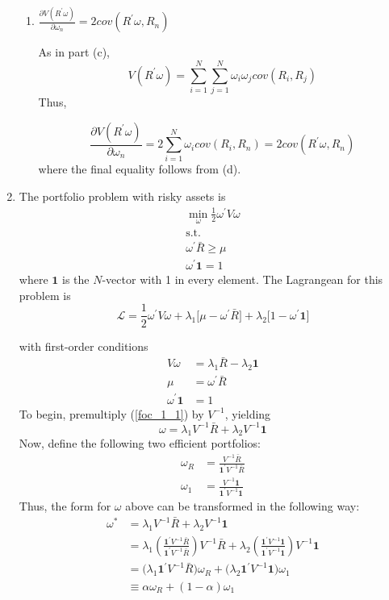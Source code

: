 \documentclass[11pt]{article}
\newcommand{\w}{\omega}
\newcommand{\p}{\prime}
\newcommand{\one}{\mathbf{1}}
\newcommand{\lagr}{\mathcal{L}}
\newcommand{\inv}[1]{#1^{-1}}
\renewcommand{\wp}{\omega^\prime}
\begin{document}
\begin{enumerate}
\begin{enumerate}
		\item $ \frac{\partial V(R^\p \w)}{\partial \w_n} = 2 cov(R^\p \w, R_n) $
		
		As in part (c), 
		\[V(R^\p \w) = \sum_{i = 1}^N \sum_{j = 1}^N \w_i \w_j cov(R_i, R_j)\]
		Thus,

		\[\frac{\partial V(R^\p \w)}{\partial \w_n} = 2 \sum_{i = 1}^N \w_i cov(R_i, R_n) = 2 cov(R^\p \w, R_n) \]
		where the final equality follows from (d).
	\end{enumerate}
	\item The portfolio problem with risky assets is 
	\begin{gather*}
	\min_\w \frac{1}{2}\w^\p V \w \\
	\text{s.t.} \\
	\w^\p \bar{R} \geq \mu \\
	\w^\p \one = 1
	\end{gather*}
	where $ \one $ is the $N$-vector with 1 in every element. The Lagrangean for this problem is
	\[\lagr = \frac{1}{2}\wp V \w + \lambda_1\big[\mu - \wp\bar{R}\big] + \lambda_2\big[1 - \wp \one\big]\]
	
	with first-order conditions
	\begin{align}
	V\w &= \lambda_1\bar{R} - \lambda_2\one \label{foc_1_1} \\
	\mu &= \wp \bar{R} \label{foc_1_2} \\
	\wp \one &= 1 \label{foc_1_3}
	\end{align}
	To begin, premultiply (\ref{foc_1_1}) by $ \inv{V} $, yielding
	\[\w = \lambda_1 \inv{V}\bar{R} + \lambda_2\inv{V}\one\]
	Now, define the following two efficient portfolios:
	\begin{align*}
	\w_R &= \frac{\inv{V}\bar{R}}{\one^\p \inv{V} \bar{R}} \\
	\w_1 &= \frac{\inv{V} \one}{\one^\p \inv{V} \one}
	\end{align*}
	Thus, the form for $ \w $ above can be transformed in the following way:
	\begin{align*}
	\w^* &= \lambda_1 \inv{V}\bar{R} + \lambda_2\inv{V}\one \\ 
	&= \lambda_1\left(\frac{\one^\p \inv{V}\bar{R}}{\one^\p \inv{V}\bar{R}}\right)\inv{V}\bar{R} + \lambda_2\left(\frac{\one^\p \inv{V}\one}{\one^\p \inv{V}\one}\right)\inv{V}\one \\
	&= \big(\lambda_1\one^\p \inv{V}\bar{R}\big)\w_R + \big(\lambda_2\one^\p \inv{V}\one\big)\w_1 \\
	&\equiv \alpha \w_R + (1 - \alpha)\w_1
	\end{align*}
	

\end{enumerate}
\end{document}
